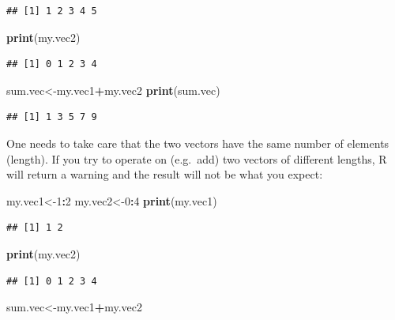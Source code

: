 \documentclass[
]{book}
\newenvironment{Shaded}{\begin{snugshade}}{\end{snugshade}}
\newcommand{\DecValTok}[1]{\textcolor[rgb]{0.00,0.00,0.81}{#1}}
\newcommand{\KeywordTok}[1]{\textcolor[rgb]{0.13,0.29,0.53}{\textbf{#1}}}
\newcommand{\NormalTok}[1]{#1}
\newcommand{\OperatorTok}[1]{\textcolor[rgb]{0.81,0.36,0.00}{\textbf{#1}}}
\theoremstyle{definition}
\theoremstyle{definition}
\theoremstyle{definition}
\theoremstyle{remark}
\begin{document}
\begin{verbatim}
## [1] 1 2 3 4 5
\end{verbatim}

\begin{Shaded}
\begin{Highlighting}[]
\KeywordTok{print}\NormalTok{(my.vec2)}
\end{Highlighting}
\end{Shaded}

\begin{verbatim}
## [1] 0 1 2 3 4
\end{verbatim}

\begin{Shaded}
\begin{Highlighting}[]
\NormalTok{sum.vec\textless{}{-}my.vec1}\OperatorTok{+}\NormalTok{my.vec2}
\KeywordTok{print}\NormalTok{(sum.vec)}
\end{Highlighting}
\end{Shaded}

\begin{verbatim}
## [1] 1 3 5 7 9
\end{verbatim}

One needs to take care that the two vectors have the same number of elements (length). If you try to operate on (e.g.~add) two vectors of different lengths, R will return a warning and the result will not be what you expect:

\begin{Shaded}
\begin{Highlighting}[]
\NormalTok{my.vec1\textless{}{-}}\DecValTok{1}\OperatorTok{:}\DecValTok{2}
\NormalTok{my.vec2\textless{}{-}}\DecValTok{0}\OperatorTok{:}\DecValTok{4}
\KeywordTok{print}\NormalTok{(my.vec1)}
\end{Highlighting}
\end{Shaded}

\begin{verbatim}
## [1] 1 2
\end{verbatim}

\begin{Shaded}
\begin{Highlighting}[]
\KeywordTok{print}\NormalTok{(my.vec2)}
\end{Highlighting}
\end{Shaded}

\begin{verbatim}
## [1] 0 1 2 3 4
\end{verbatim}

\begin{Shaded}
\begin{Highlighting}[]
\NormalTok{sum.vec\textless{}{-}my.vec1}\OperatorTok{+}\NormalTok{my.vec2}
\end{Highlighting}
\end{Shaded}
\end{document}

